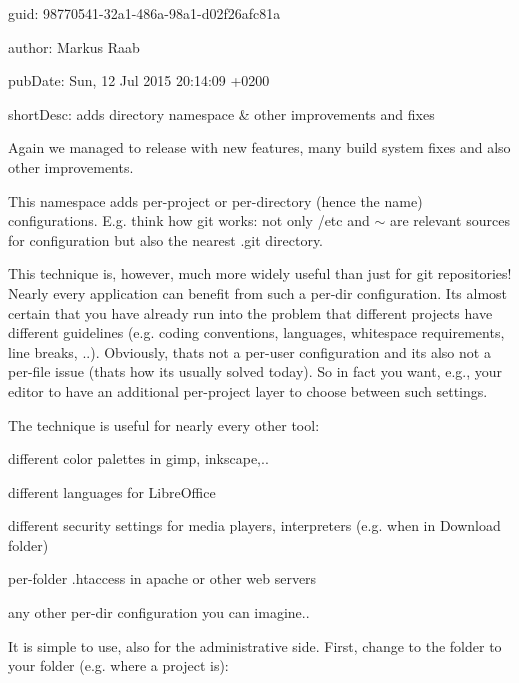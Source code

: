
\begin{DoxyItemize}
\item guid\+: 98770541-\/32a1-\/486a-\/98a1-\/d02f26afc81a
\item author\+: Markus Raab
\item pub\+Date\+: Sun, 12 Jul 2015 20\+:14\+:09 +0200
\item short\+Desc\+: adds directory namespace \& other improvements and fixes
\end{DoxyItemize}

Again we managed to release with new features, many build system fixes and also other improvements.

This namespace adds per-\/project or per-\/directory (hence the name) configurations. E.\+g. think how git works\+: not only /etc and $\sim$ are relevant sources for configuration but also the nearest .git directory.

This technique is, however, much more widely useful than just for git repositories! Nearly every application can benefit from such a per-\/dir configuration. Its almost certain that you have already run into the problem that different projects have different guidelines (e.\+g. coding conventions, languages, whitespace requirements, line breaks, ..). Obviously, thats not a per-\/user configuration and its also not a per-\/file issue (thats how its usually solved today). So in fact you want, e.\+g., your editor to have an additional per-\/project layer to choose between such settings.

The technique is useful for nearly every other tool\+:


\begin{DoxyItemize}
\item different color palettes in gimp, inkscape,..
\item different languages for Libre\+Office
\item different security settings for media players, interpreters (e.\+g. when in Download folder)
\item per-\/folder .htaccess in apache or other web servers
\item any other per-\/dir configuration you can imagine..
\end{DoxyItemize}

It is simple to use, also for the administrative side. First, change to the folder to your folder (e.\+g. where a project is)\+:


\begin{DoxyCode}{0}
\end{DoxyCode}



